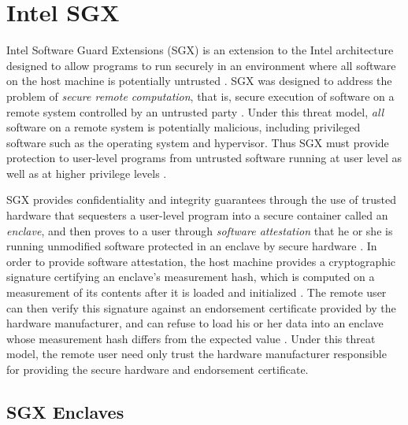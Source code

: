 \section{Intel SGX}

Intel Software Guard Extensions (SGX) is an extension to the Intel architecture designed to allow programs to run securely in an environment where all software on the host machine is potentially untrusted \cite{intel_corporation_intel_2016}. SGX was designed to address the problem of \emph{secure remote computation}, that is, secure execution of software on a remote system controlled by an untrusted party \cite{intel_corporation_intel_2016}. Under this threat model, \emph{all} software on a remote system is potentially malicious, including privileged software such as the operating system and hypervisor. Thus SGX must provide protection to user-level programs from untrusted software running at user level as well as at higher privilege levels \cite{costan_intel_2016}. 

SGX provides confidentiality and integrity guarantees through the use of trusted hardware that sequesters a user-level program into a secure container called an \emph{enclave}, and then proves to a user through \emph{software attestation} that he or she is running unmodified software protected in an enclave by secure hardware \cite{intel_corporation_intel_2016}. In order to provide software attestation, the host machine provides a cryptographic signature certifying an enclave's measurement hash, which is computed on a measurement of its contents after it is loaded and initialized \cite{costan_intel_2016}. The remote user can then verify this signature against an endorsement certificate provided by the hardware manufacturer, and can refuse to load his or her data into an enclave whose measurement hash differs from the expected value \cite{intel_corporation_intel_2016, costan_intel_2016}. Under this threat model, the remote user need only trust the hardware manufacturer responsible for providing the secure hardware and endorsement certificate.

\subsection{SGX Enclaves}

